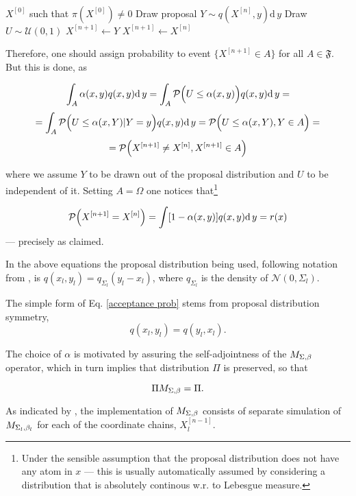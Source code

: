 \begin{Algo}[\MH]
	\ 	
	\begin{algorithmic}
		\Require $X^{[0]}$ such that $\pi(X^{[0]}) \not=0$
				\State Draw proposal $Y \sim q(X^{[n]},y)\mathrm{d}\,y$
				\State Draw $U \sim \mathcal{U}(0,1)$
					\State $X^{[n+1]} \gets Y$	
				\Else
					\State $X^{[n+1]} \gets X^{[n]}$	
				\EndIf
			\EndFor			
		\EndProcedure	 
	\end{algorithmic}		
\end{Algo}

Therefore, one should assign probability to event $\{ X^{[n+1]} \in A\}$ for all $A \in \mathfrak{F}$. But this is done, as

$$\int_A  \alpha(x,y) q(x,y) \mathrm{d}\,y = \int_A \mathcal{P} \Big( U \leq \alpha(x,y) \Big)q(x,y) \mathrm{d}\,y =$$
$$
	=\int_A \mathcal{P}\Big( U \leq \alpha(x,Y) | Y=y \Big)q(x,y) \mathrm{d}\,y = \mathcal{P}\Big( U \leq \alpha(x,Y), Y \in A \Big)=
$$
$$
	= \mathcal{P}\Big(X^{[n+1]} \not= X^{[n]} , X^{[n+1]} \in A \Big)
$$

where we assume $Y$ to be drawn out of the proposal distribution and $U$ to be independent of it. Setting $A = \Omega$ one notices that\footnote{Under the sensible assumption that the proposal distribution does not have any atom in $x$ --- this is usually automatically assumed by considering a distribution that is absolutely continous w.r. to Lebesgue measure.} 

$$ \mathcal{P}\Big(X^{[n+1]} = X^{[n]}\Big) = \int  [ 1 - \alpha(x,y)] q(x,y) \mathrm{d}\,y = r(x)$$
--- precisely as claimed. 

In the above equations the proposal distribution being used, following notation from \cite{CharlesJ.Geyer}, is $q(x_l,y_l) = q_{\Sigma_l} (y_l - x_l)$, where $q_{\Sigma_l}$ is the density of $\mathcal{N}(0, \Sigma_l)$. 

The simple form of Eq. \ref{acceptance prob} stems from proposal distribution symmetry, $$q(x_l,y_l) = q(y_l,x_l).$$

The choice of $\alpha$ is motivated by assuring the self-adjointness of the $M_{\Sigma,\beta}$ operator, which in turn implies that distribution $\Pi$ is preserved, so that
	
\begin{equation}
	\Pi M_{\Sigma,\beta} = \Pi.		
\end{equation}	

As indicated by \cite{BM2}, the implementation of $M_{\Sigma,\beta}$ consists of separate simulation of $M_{\Sigma_{l},\beta_{l}}$ for each of the coordinate chains,  $X^{[n-1]}_l$.

